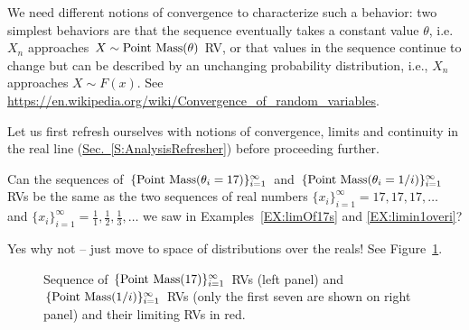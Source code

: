 We need different notions of convergence to characterize such a behavior: two simplest behaviors are that the sequence eventually takes a constant value $\theta$, 
i.e. $X_n$ approaches $X \sim \mbox{{\rm Point~Mass}}(\theta)$ RV, or that values in the sequence continue to change but can be described by an unchanging probability distribution, i.e., $X_n$ approaches $X \sim F(x)$. See \url{https://en.wikipedia.org/wiki/Convergence_of_random_variables}.

Let us first refresh ourselves with notions of convergence, limits and continuity in the real line (\hyperref[S:AnalysisRefresher]{Sec.~\ref*{S:AnalysisRefresher}}) before proceeding further.

Can the sequences of $\{\mbox{{\rm Point~Mass}}(\theta_i=17)\}_{i=1}^{\infty}$ and $\{\mbox{{\rm Point~Mass}}(\theta_i=1/i)\}_{i=1}^{\infty}$ RVs be the same as the two sequences of real numbers $\{ x_i \}_{i=1}^{\infty} = 17, 17, 17, \ldots$ and $\{ x_i \}_{i=1}^{\infty} = \frac{1}{1},\frac{1}{2},\frac{1}{3}, \ldots$ we saw in Examples~\ref{EX:limOf17s} and \ref{EX:limin1overi}?


Yes why not -- just move to space of distributions over the reals! See Figure~\ref{F:SequenceOfPointMassRVS17And1Byi}.

\begin{figure}[htpb]
\caption{Sequence of $\{\mbox{{\rm Point~Mass}}(17)\}_{i=1}^{\infty}$ RVs (left panel) and $\{\mbox{{\rm Point~Mass}}(1/i)\}_{i=1}^{\infty}$ RVs (only the first seven are shown on right panel) and their limiting RVs in red.\label{F:SequenceOfPointMassRVS17And1Byi}}
\centering   {}
\end{figure}

